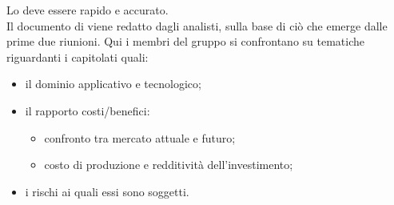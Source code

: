 			Lo  deve essere rapido e accurato.\\
			Il documento di  viene redatto dagli analisti, sulla base di ciò che emerge dalle prime due riunioni. Qui i membri del gruppo si confrontano su tematiche riguardanti i capitolati quali:
			\begin{itemize}
				\item il dominio applicativo e tecnologico;
				\item il rapporto costi/benefici:
				\begin{itemize}
					\item confronto tra mercato attuale e futuro;
					\item costo di produzione e redditività dell'investimento;
				\end{itemize}
				\item i rischi ai quali essi sono soggetti.
			\end{itemize}


